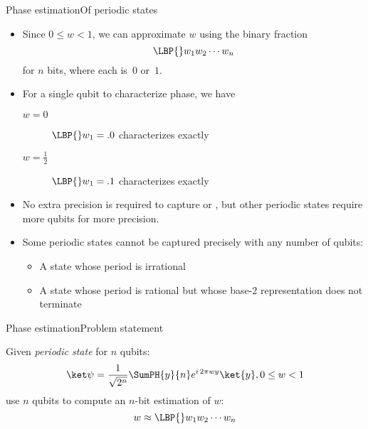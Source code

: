 \begin{frame}{Phase estimation}{Of periodic states}

\begin{itemize}[<+->]
    \item Since $0\leq w < 1$, we can approximate $w$ using the binary fraction
    \[ \LBP{}w_{1}w_{2}\cdots w_{n}\]
    for $n$ bits, where each is~$0$ or~$1$.
    \item For a single qubit to characterize phase, we have
    \begin{description}
        \item[$w=0$]  $\LBP{}w_{1}=.0$ characterizes \ket{+} exactly
        \item[$w=\frac{1}{2}$] $\LBP{}w_{1}=.1$ characterizes \ket{-} exactly
    \end{description}
    \item No extra precision is required to capture \ket{+} or \ket{-}, but other periodic states require more qubits for more precision.
    \item Some periodic states cannot be captured precisely with any number of qubits:
    \begin{itemize}
        \item A state whose period is irrational
        \item A state whose period is rational but whose base-$2$ representation does not terminate
    \end{itemize}
\end{itemize}
    
\end{frame}

\begin{frame}{Phase estimation}{Problem statement}

Given \emph{periodic state} \QState{} for $n$ qubits: 
\[
\QState{} = \RootTwoN{n}\SumPH{y}{n} \ExpPhase{2\pi wy} \ket{y},  0 \leq w < 1
\]
use $n$ qubits to compute an $n$-bit estimation of $w$:
\[
w \approx \LBP{}w_{1}w_{2}\cdots w_{n} 
\]
    
\end{frame}

